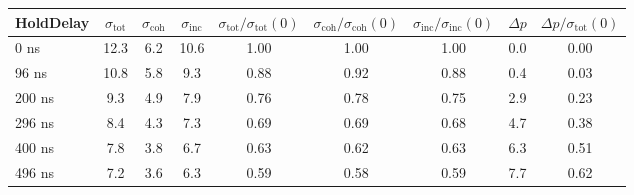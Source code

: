 \begin{tabular}{lcccccccc}
\toprule
HoldDelay & $\sigma_\mathrm{tot}$ & $\sigma_\mathrm{coh}$ & $\sigma_\mathrm{inc}$ & $\sigma_\mathrm{tot}/\sigma_\mathrm{tot}(0)$ & $\sigma_\mathrm{coh}/\sigma_\mathrm{coh}(0)$ & $\sigma_\mathrm{inc}/\sigma_\mathrm{inc}(0)$ & $\Delta p$ & $\Delta p/\sigma_\mathrm{tot}(0)$ \\
\midrule
0 ns & 12.3 & 6.2 & 10.6 & 1.00 & 1.00 & 1.00 & 0.0 & 0.00 \\
96 ns & 10.8 & 5.8 & 9.3 & 0.88 & 0.92 & 0.88 & 0.4 & 0.03 \\
200 ns & 9.3 & 4.9 & 7.9 & 0.76 & 0.78 & 0.75 & 2.9 & 0.23 \\
296 ns & 8.4 & 4.3 & 7.3 & 0.69 & 0.69 & 0.68 & 4.7 & 0.38 \\
400 ns & 7.8 & 3.8 & 6.7 & 0.63 & 0.62 & 0.63 & 6.3 & 0.51 \\
496 ns & 7.2 & 3.6 & 6.3 & 0.59 & 0.58 & 0.59 & 7.7 & 0.62 \\
\bottomrule
\end{tabular}
